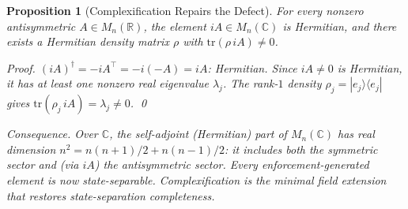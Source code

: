 \documentclass[11pt,a4paper]{article}
\newtheorem{proposition}[theorem]{Proposition}
\theoremstyle{definition}
\newcommand{\tr}{\mathrm{tr}}
\begin{document}
\begin{proposition}[Complexification Repairs the Defect]\label{prop:C_repair}
For every nonzero antisymmetric $A \in M_n(\mathbb{R})$, the element $iA \in M_n(\mathbb{C})$ is Hermitian, and there exists a Hermitian density matrix $\rho$ with $\tr(\rho\,iA) \ne 0$.

\smallskip\noindent\textit{Proof.}  $(iA)^\dagger = -i A^\top = -i(-A) = iA$: Hermitian.  Since $iA \ne 0$ is Hermitian, it has at least one nonzero real eigenvalue $\lambda_j$.  The rank-$1$ density $\rho_j = |e_j\rangle\langle e_j|$ gives $\tr(\rho_j\, iA) = \lambda_j \ne 0$.  \qed

\smallskip\noindent\textit{Consequence.}  Over $\mathbb{C}$, the self-adjoint (Hermitian) part of $M_n(\mathbb{C})$ has real dimension $n^2 = n(n+1)/2 + n(n-1)/2$: it includes both the symmetric sector and (via $iA$) the antisymmetric sector.  Every enforcement-generated element is now state-separable.  Complexification is the minimal field extension that restores state-separation completeness.
\end{proposition}
\end{document}
